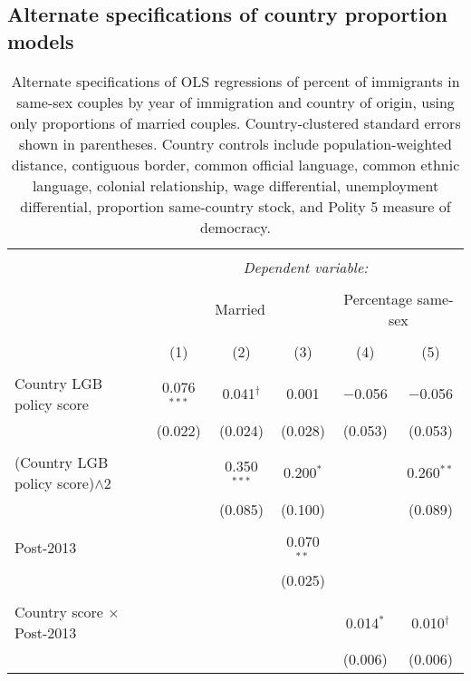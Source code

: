\documentclass[
  11pt,
]{article}
\begin{document}
\newpage

\hypertarget{alternate-specifications-of-country-proportion-models}{%
\subsection{Alternate specifications of country proportion models}\label{alternate-specifications-of-country-proportion-models}}

\begin{table}[!htbp] \centering 
  \caption{Alternate specifications of OLS regressions of percent of immigrants in same-sex couples by year of immigration and country of origin, using only proportions of married couples. Country-clustered standard errors shown in parentheses. Country controls include population-weighted distance, contiguous border, common official language, common ethnic language, colonial relationship, wage differential, unemployment differential, proportion same-country stock, and Polity 5 measure of democracy.} 
  \label{tab:country-props-alt} 
\begin{tabular}{@{\extracolsep{5pt}}lccccc} 
\\[-1.8ex]\hline 
\hline \\[-1.8ex] 
 & \multicolumn{5}{c}{\textit{Dependent variable:}} \\ 
\cline{2-6} 
\\[-1.8ex] & \multicolumn{3}{c}{Married} & \multicolumn{2}{c}{Percentage same-sex} \\ 
\\[-1.8ex] & (1) & (2) & (3) & (4) & (5)\\ 
\hline \\[-1.8ex] 
 Country LGB policy score & 0.076$^{***}$ & 0.041$^{†}$ & 0.001 & $-$0.056 & $-$0.056 \\ 
  & (0.022) & (0.024) & (0.028) & (0.053) & (0.053) \\ 
  & & & & & \\ 
 (Country LGB policy score)$\wedge{}$2 &  & 0.350$^{***}$ & 0.200$^{*}$ &  & 0.260$^{**}$ \\ 
  &  & (0.085) & (0.100) &  & (0.089) \\ 
  & & & & & \\ 
 Post-2013 &  &  & 0.070$^{**}$ &  &  \\ 
  &  &  & (0.025) &  &  \\ 
  & & & & & \\ 
 Country score × Post-2013 &  &  &  & 0.014$^{*}$ & 0.010$^{†}$ \\ 
  &  &  &  & (0.006) & (0.006) \\ 

\end{tabular}
\end{table}
\end{document}
